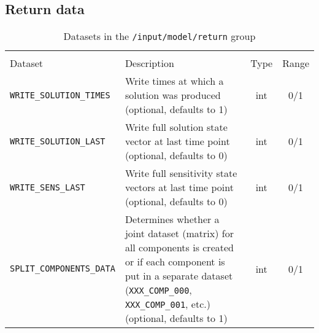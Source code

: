 \FloatBarrier
\subsection{Return data}

\begin{table}[!ht]
\footnotesize
\begin{tabu}to \linewidth[m]{lX[m]cc} \toprule
{} \\
\rowfont[c]\normalfont Dataset & Description & Type & Range \everyrow{\midrule}\\
\texttt{WRITE\_SOLUTION\_TIMES} & Write times at which a solution was produced (optional, defaults to 1) & int & 0/1 \\
\texttt{WRITE\_SOLUTION\_LAST} & Write full solution state vector at last time point (optional, defaults to 0) & int & 0/1 \\
\texttt{WRITE\_SENS\_LAST} & Write full sensitivity state vectors at last time point (optional, defaults to 0) & int & 0/1 \\
\texttt{SPLIT\_COMPONENTS\_DATA} & Determines whether a joint dataset (matrix) for all components is created or if each component is put in a separate dataset (\texttt{XXX\_COMP\_000}, \texttt{XXX\_COMP\_001}, etc.) (optional, defaults to 1) & int & 0/1 \everyrow{}\\
\bottomrule
\end{tabu}
\caption{\label{tab:FFReturn}Datasets in the \texttt{/input/model/return} group}
\end{table}

